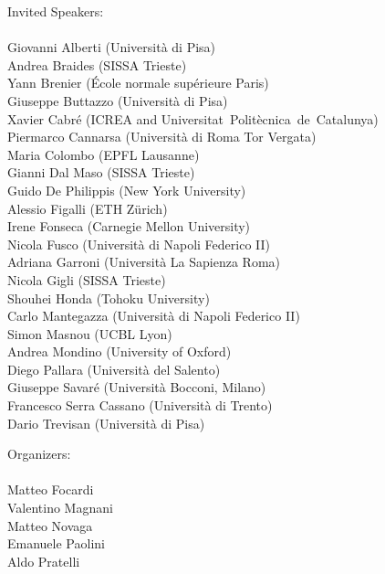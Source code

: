 \documentclass[a4paper]{article}
\newcommand{\bah}[1]{\textsf{#1}\\}
\begin{document}
\color{my}
\vspace{3cm}
\mbox{}\hspace{1cm}
\begin{minipage}{0.45\textwidth}
\Large
\bah{Invited Speakers:}
\\
\normalsize
\textsf{
Giovanni Alberti (Università di Pisa)\\
Andrea Braides (SISSA Trieste)\\
Yann Brenier (École normale supérieure Paris)\\
Giuseppe Buttazzo (Università di Pisa)\\
Xavier Cabré (ICREA and \mbox{Universitat~Politècnica~de~Catalunya)\hspace{-3cm}\mbox{}}\\
Piermarco Cannarsa (Università di Roma Tor Vergata)\\
Maria Colombo (EPFL Lausanne)\\
Gianni Dal Maso (SISSA Trieste)\\
Guido De Philippis (New York University)\\
Alessio Figalli (ETH Zürich)\\
Irene Fonseca (Carnegie Mellon University)\\
Nicola Fusco (Università di Napoli Federico II)\\
Adriana Garroni (Università La Sapienza Roma)\\
Nicola Gigli (SISSA Trieste)\\
Shouhei Honda (Tohoku University)\\
Carlo Mantegazza (Università di Napoli Federico II)\\
Simon Masnou (UCBL Lyon)\\
Andrea Mondino (University of Oxford)\\
Diego Pallara (Università del Salento)\\
Giuseppe Savaré (Università Bocconi, Milano)\\
Francesco Serra Cassano (Università di Trento)\\
Dario Trevisan (Università di Pisa)\\
}
\end{minipage}
\vspace{1.4cm}
\hspace{4cm}
\begin{minipage}{0.45\textwidth}
    \vspace{7cm}
    \Large
    \bah{Organizers:}
    \\
    \normalsize
    \textsf{
        Matteo Focardi\\
        Valentino Magnani\\
        Matteo Novaga\\
        Emanuele Paolini\\
        Aldo Pratelli
    }\\
    \end{minipage}
\end{document}
